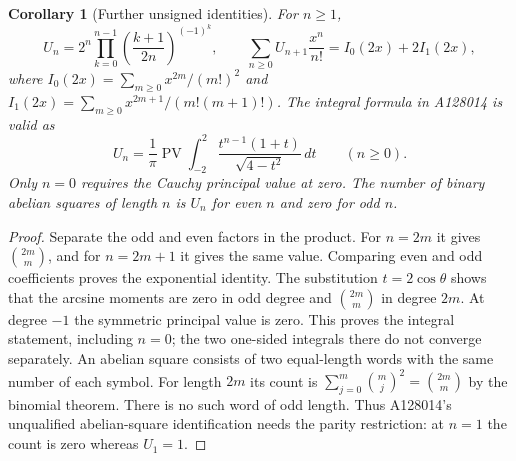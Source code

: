 \documentclass[11pt]{article}
\newtheorem{corollary}[theorem]{Corollary}
\begin{document}
\begin{corollary}[Further unsigned identities]\label{cor:unsigned}
For $n\geq1$,
\[
 U_n=2^n\prod_{k=0}^{n-1}\left(\frac{k+1}{2n}\right)^{(-1)^k},
 \qquad
 \sum_{n\geq0}U_{n+1}\frac{x^n}{n!}=I_0(2x)+2I_1(2x),
\]
where $I_0(2x)=\sum_{m\geq0}x^{2m}/(m!)^2$ and
$I_1(2x)=\sum_{m\geq0}x^{2m+1}/(m!(m+1)!)$.
The integral formula in A128014 is valid as
\[
 U_n=\frac1\pi\operatorname{PV}\int_{-2}^2
 \frac{t^{n-1}(1+t)}{\sqrt{4-t^2}}\,dt \qquad(n\geq0).
\]
Only $n=0$ requires the Cauchy principal value at zero.
The number of binary abelian squares of length $n$ is $U_n$ for even $n$
and zero for odd $n$.
\end{corollary}
\begin{proof}
Separate the odd and even factors in the product. For $n=2m$ it gives
$\binom{2m}{m}$, and for $n=2m+1$ it gives the same value. Comparing
even and odd coefficients proves the exponential identity.
The substitution $t=2\cos\theta$ shows that the arcsine moments
are zero in odd degree and $\binom{2m}{m}$ in degree $2m$.
At degree $-1$ the symmetric principal value is zero. This proves the
integral statement, including $n=0$; the two one-sided integrals there
do not converge separately.
An abelian square consists of two equal-length words with the same number
of each symbol. For length $2m$ its count is
$\sum_{j=0}^m\binom mj^2=\binom{2m}{m}$ by the binomial theorem.
There is no such word of odd length. Thus A128014's unqualified
abelian-square identification needs the parity restriction: at $n=1$
the count is zero whereas $U_1=1$.
\end{proof}
\end{document}

